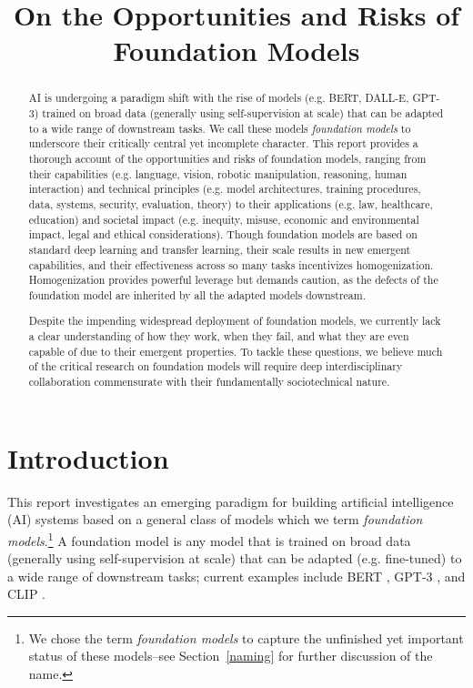 \title{On the Opportunities and Risks of Foundation Models}

\begin{abstract}
AI is undergoing a paradigm shift with the rise of models (e.g. BERT, DALL-E, GPT-3) trained on broad data (generally using self-supervision at scale) that can be adapted to a wide range of downstream tasks. We call these models \emph{foundation models} to underscore their critically central yet incomplete character. This report provides a thorough account of the opportunities and risks of foundation models, ranging from their capabilities (e.g. language, vision, robotic manipulation, reasoning, human interaction) and technical principles (e.g. model architectures, training procedures, data, systems, security, evaluation, theory) to their applications (e.g. law, healthcare, education) and societal impact (e.g. inequity, misuse, economic and environmental impact, legal and ethical considerations). Though foundation models are based on standard deep learning and transfer learning, their scale results in new emergent capabilities, and their effectiveness across so many tasks incentivizes homogenization. Homogenization provides powerful leverage but demands caution, as the defects of the foundation model are inherited by all the adapted models downstream.

Despite the impending widespread deployment of foundation models, we currently lack a clear understanding of how they work, when they fail, and what they are even capable of due to their emergent properties. To tackle these questions, we believe much of the critical research on foundation models will require deep interdisciplinary collaboration commensurate with their fundamentally sociotechnical nature.
\end{abstract}

\section{Introduction}
\label{sec:introduction}

This report investigates an emerging paradigm for building artificial intelligence (AI) systems based on a general class of models which we term \emph{foundation models}.\footnote{We chose the term \emph{foundation models} to capture the unfinished yet important status of these models--see Section~\ref{naming} for further discussion of the name.} A foundation model is any model that is trained on broad data (generally using self-supervision at scale) that can be adapted (e.g. fine-tuned) to a wide range of downstream tasks; current examples include BERT \citep{devlin2019bert}, GPT-3 \citep{brown2020gpt3}, and CLIP \citep{radford2021learning}.

